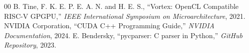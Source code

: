 \documentclass[10pt, conference, compsocconf]{IEEEtran}
\begin{document}
\begin{thebibliography}{00}
 B. Tine, F. K. E. P. E. A. N. and H. E. S., ``Vortex: OpenCL Compatible RISC-V GPGPU,'' \textit{IEEE International Symposium on Microarchitecture}, 2021.
 NVIDIA Corporation, ``CUDA C++ Programming Guide,'' \textit{NVIDIA Documentation}, 2024.
 E. Bendersky, ``pycparser: C parser in Python,'' \textit{GitHub Repository}, 2023.
\end{thebibliography}
\end{document}
